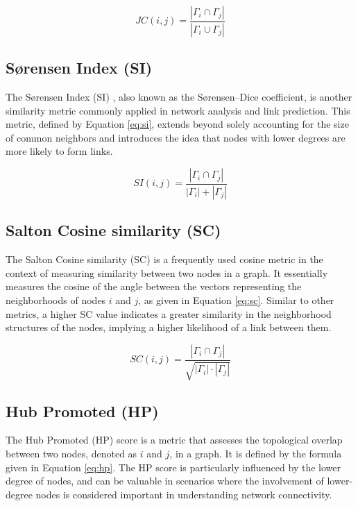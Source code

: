 \begin{equation}
\label{eq:jc}
  JC(i, j) = \frac{|\Gamma_i \cap \Gamma_j|}{|\Gamma_i \cup \Gamma_j|}
\end{equation}




\subsection{S{\o}rensen Index (SI)}

The S{\o}rensen Index (SI) \cite{sorensen1948method}, also known as the S{\o}rensen–Dice coefficient, is another similarity metric commonly applied in network analysis and link prediction. This metric, defined by Equation \ref{eq:si}, extends beyond solely accounting for the size of common neighbors and introduces the idea that nodes with lower degrees are more likely to form links.

\begin{equation}
\label{eq:si}
  SI(i, j) = \frac{|\Gamma_i \cap \Gamma_j|}{|\Gamma_i| + |\Gamma_j|}
\end{equation}




\subsection{Salton Cosine similarity (SC)}

The Salton Cosine similarity (SC) \cite{salton1973specification} is a frequently used cosine metric in the context of measuring similarity between two nodes in a graph. It essentially measures the cosine of the angle between the vectors representing the neighborhoods of nodes $i$ and $j$, as given in Equation \ref{eq:sc}. Similar to other metrics, a higher SC value indicates a greater similarity in the neighborhood structures of the nodes, implying a higher likelihood of a link between them.

\begin{equation}
\label{eq:sc}
  SC(i, j) = \frac{|\Gamma_i \cap \Gamma_j|}{\sqrt{|\Gamma_i| \cdot |\Gamma_j|}}
\end{equation}




\subsection{Hub Promoted (HP)}

The Hub Promoted (HP) score \cite{liben2003link} is a metric that assesses the topological overlap between two nodes, denoted as $i$ and $j$, in a graph. It is defined by the formula given in Equation \ref{eq:hp}. The HP score is particularly influenced by the lower degree of nodes, and can be valuable in scenarios where the involvement of lower-degree nodes is considered important in understanding network connectivity.

